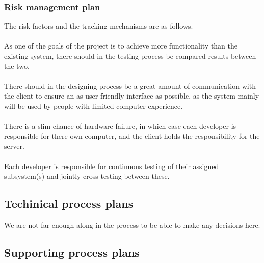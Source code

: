 \documentclass[12pt]{article}
\begin{document}
\subsubsection{Risk management plan}
The risk factors and the tracking mechanisms are as follows. \\\\
As one of the goals of the project is to achieve more functionality than the existing system, there should in the testing-process be compared results between the two. \\\\
There should in the designing-process be a great amount of communication with the client to ensure an as user-friendly interface as possible, as the system mainly will be used by people with limited computer-experience. \\\\
There is a slim chance of hardware failure, in which case each developer is responsible for there own computer, and the client holds the responsibility for the server. \\\\
Each developer is responsible for continuous testing of their assigned subsystem(s) and jointly cross-testing between these. 
\subsection{Techinical process plans}
We are not far enough along in the process to be able to make any decisions here.
\subsection{Supporting process plans}
\end{document}
